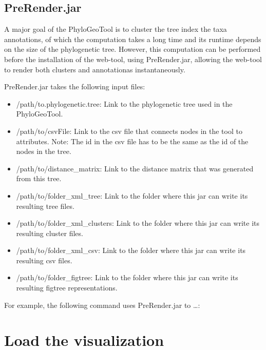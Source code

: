 \documentclass[a4paper, 11pt]{article} %
\begin{document}
\subsection{PreRender.jar}
A major goal of the PhyloGeoTool is to cluster the tree index the taxa annotations, of which the computation takes a long time and its runtime depends on the size of the phylogenetic tree. However, this computation can be performed before the installation of the web-tool, using PreRender.jar, allowing the web-tool to render both clusters and annotationas instantaneously.


PreRender.jar takes the following input files: %
\begin{itemize}
\item /path/to.phylogenetic.tree: Link to the phylogenetic tree used in the PhyloGeoTool.
\item /path/to/csvFile: Link to the csv file that connects nodes in the tool to attributes. Note: The id in the csv file has to be the same as the id of the nodes in the tree.
\item /path/to/distance\_matrix: Link to the distance matrix that was generated from this tree. %
\item /path/to/folder\_xml\_tree: Link to the folder where this jar can write its resulting tree files.
\item /path/to/folder\_xml\_clusters: Link to the folder where this jar can write its resulting cluster files.
\item /path/to/folder\_xml\_csv: Link to the folder where this jar can write its resulting csv files.
\item /path/to/folder\_figtree: Link to the folder where this jar can write its resulting figtree representations.
\end{itemize}

For example, the following command uses PreRender.jar to \ldots: %

\section{Load the visualization}
\end{document}
